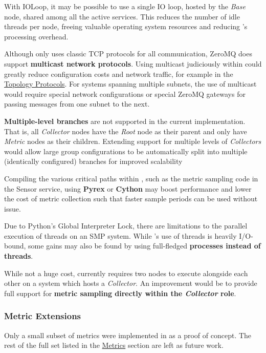 With IOLoop, it may be possible to use a single IO loop, hosted by the \textit{Base} node, shared among all the active
services. This reduces the number of idle threads per node, freeing valuable operating system resources and reducing
\dcampns's processing overhead.

Although \dcamp only uses classic TCP protocols for all communication, ZeroMQ does support \textbf{multicast network
protocols}. Using multicast judiciously within \dcamp could greatly reduce configuration costs and network traffic, for
example in the \hyperref[proto_topo]{Topology Protocols}. For \dcamp systems spanning multiple subnets, the use of
multicast would require special network configurations or special ZeroMQ gateways for passing messages from one subnet
to the next.

\textbf{Multiple-level branches} are not supported in the current implementation. That is, all \textit{Collector} nodes
have the \textit{Root} node as their parent and only have \textit{Metric} nodes as their children. Extending support for
multiple levels of \textit{Collectors} would allow large group configurations to be automatically split into multiple
(identically configured) branches for improved scalability

Compiling the various critical paths within \dcampns, such as the metric sampling code in the Sensor service, using
\textbf{Pyrex}\cite{pyrex} or \textbf{Cython}\cite{cython} may boost performance and lower the cost of metric collection
such that faster sample periods can be used without issue.

Due to Python's Global Interpreter Lock\cite{py-threads}, there are limitations to the parallel execution of threads on
an SMP system. While \dcampns's use of threads is heavily I/O-bound, some gains may also be found by using full-fledged
\textbf{processes instead of threads}.

While not a huge cost, \dcamp currently requires two nodes to execute alongside each other on a system which hosts a
\textit{Collector}. An improvement would be to provide full support for \textbf{metric sampling directly within the
\textit{Collector} role}.

\subsubsection{Metric Extensions}
\label{metric_extensions}

Only a small subset of metrics were implemented in \dcamp as a proof of concept. The rest of the full set listed in the
\hyperref[dcamp_metrics]{\dcamp Metrics} section are left as future work.

